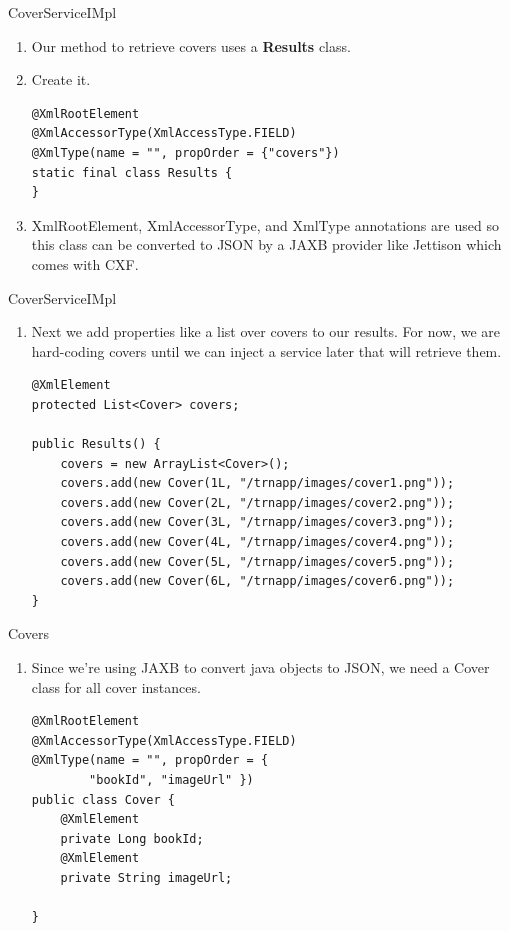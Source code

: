 \documentclass[xcolor=dvipsnames,14pt,professionalfonts]{beamer}
\begin{document}
\begin{frame}[fragile]{CoverServiceIMpl}
  \begin{enumerate}
  \item Our method to retrieve covers uses a \textbf{Results} class. 
  \item Create it.
    \begin{verbatim}
@XmlRootElement
@XmlAccessorType(XmlAccessType.FIELD)
@XmlType(name = "", propOrder = {"covers"})
static final class Results {
}
\end{verbatim}
\item XmlRootElement, XmlAccessorType, and XmlType annotations are
  used so this class can be converted to JSON by a JAXB provider like
  Jettison which comes with CXF.
\end{enumerate}
\end{frame}

\begin{frame}[fragile]{CoverServiceIMpl}
  \begin{enumerate}
    \item Next we add properties like a list over covers to our
      results. For now, we are hard-coding covers until we can inject
      a service later that will retrieve them.
    \begin{verbatim}
@XmlElement
protected List<Cover> covers;
	
public Results() {
	covers = new ArrayList<Cover>();
	covers.add(new Cover(1L, "/trnapp/images/cover1.png"));
	covers.add(new Cover(2L, "/trnapp/images/cover2.png"));
	covers.add(new Cover(3L, "/trnapp/images/cover3.png"));
	covers.add(new Cover(4L, "/trnapp/images/cover4.png"));
	covers.add(new Cover(5L, "/trnapp/images/cover5.png"));
	covers.add(new Cover(6L, "/trnapp/images/cover6.png"));
}
\end{verbatim}
\end{enumerate}
\end{frame}

\begin{frame}[fragile]{Covers}
  \begin{enumerate}
    \item Since we're using JAXB to convert java objects to JSON, we
      need a Cover class for all cover instances.
    \begin{verbatim}
@XmlRootElement
@XmlAccessorType(XmlAccessType.FIELD)
@XmlType(name = "", propOrder = {
        "bookId", "imageUrl" })
public class Cover {
	@XmlElement
	private Long bookId;
	@XmlElement
	private String imageUrl;

}
\end{verbatim} 
\end{enumerate}
\end{frame}
\end{document}
